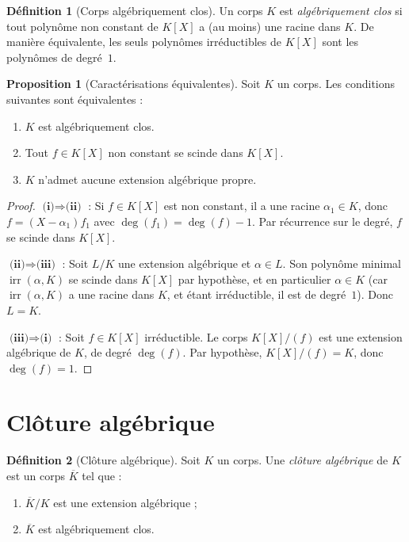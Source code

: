 \documentclass[12pt,a4paper,openany]{book}
\theoremstyle{definition}
\newtheorem{definition}{Définition}[chapter]
\newtheorem{proposition}{Proposition}[chapter]
\newcommand{\irr}{\operatorname{irr}}
\renewcommand{\deg}{\operatorname{deg}}
\begin{document}
\begin{definition}[Corps algébriquement clos]\label{def:algebriquement-clos}
Un corps $K$ est \emph{algébriquement clos} si tout polynôme non constant de
$K[X]$ a (au moins) une racine dans $K$. De manière équivalente, les seuls
polynômes irréductibles de $K[X]$ sont les polynômes de degré~$1$.
\end{definition}

\begin{proposition}[Caractérisations équivalentes]\label{prop:car-alg-clos}
Soit $K$ un corps. Les conditions suivantes sont équivalentes :
\begin{enumerate}[label=(\roman*)]
  \item $K$ est algébriquement clos.
  \item Tout $f \in K[X]$ non constant se scinde dans $K[X]$.
  \item $K$ n'admet aucune extension algébrique propre.
\end{enumerate}
\end{proposition}

\begin{proof}
$\textbf{(i)} \Rightarrow \textbf{(ii)}$ :
Si $f \in K[X]$ est non constant, il a une racine $\alpha_1 \in K$, donc
$f = (X - \alpha_1) f_1$ avec $\deg(f_1) = \deg(f) - 1$. Par récurrence sur
le degré, $f$ se scinde dans $K[X]$.

$\textbf{(ii)} \Rightarrow \textbf{(iii)}$ :
Soit $L/K$ une extension algébrique et $\alpha \in L$. Son polynôme minimal
$\irr(\alpha, K)$ se scinde dans $K[X]$ par hypothèse, et en particulier
$\alpha \in K$ (car $\irr(\alpha, K)$ a une racine dans $K$, et étant
irréductible, il est de degré~$1$). Donc $L = K$.

$\textbf{(iii)} \Rightarrow \textbf{(i)}$ :
Soit $f \in K[X]$ irréductible. Le corps $K[X]/(f)$ est une extension algébrique
de $K$, de degré $\deg(f)$. Par hypothèse, $K[X]/(f) = K$, donc $\deg(f) = 1$.
\end{proof}

\section{Clôture algébrique}
\label{sec:cloture}

\begin{definition}[Clôture algébrique]\label{def:cloture}
Soit $K$ un corps. Une \emph{clôture algébrique} de $K$ est un corps
$\overline{K}$ tel que :
\begin{enumerate}[label=(\roman*)]
  \item $\overline{K}/K$ est une extension algébrique ;
  \item $\overline{K}$ est algébriquement clos.
\end{enumerate}
\end{definition}
\end{document}

